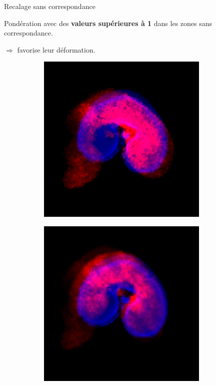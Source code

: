 \documentclass[10pt]{beamer}
\begin{document}
\begin{frame}{Recalage sans correspondance}

  Pondération avec des \textbf{valeurs supérieures à 1} dans les zones sans correspondance.
  
  $\Rightarrow$ favorise leur déformation.

  \begin{figure}[ht]
    \centering
    \begin{subfigure}[t]{0.33\textwidth}
      \centering
      \includegraphics[width=0.9\textwidth]{fig/slice_overlay_affine}
      \caption{}
      \label{subfig:slice_overlay_affine}
    \end{subfigure}%
    \begin{subfigure}[t]{0.33\textwidth}
      \centering
      \includegraphics[width=0.9\textwidth]{fig/slice_overlay_ssdweight.png}
      \caption{}
      \label{subfig:field_variational}
    \end{subfigure}%
  \end{figure}
\end{frame}
\end{document}
